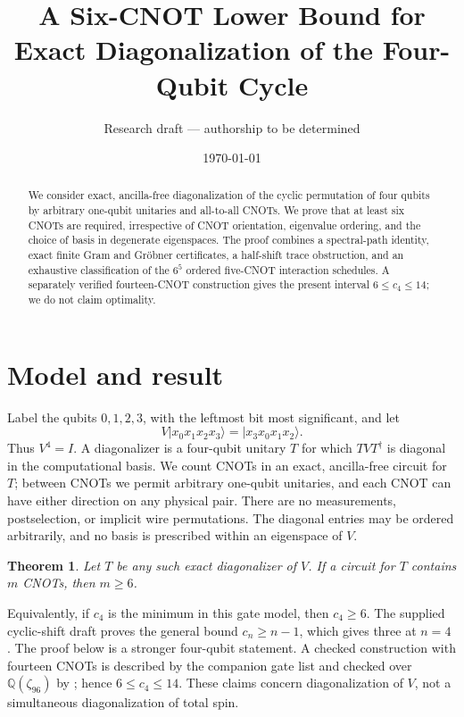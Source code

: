 \documentclass[11pt]{article}
\title{A Six-CNOT Lower Bound for Exact Diagonalization of the Four-Qubit Cycle}
\author{Research draft --- authorship to be determined}
\date{\today}
\newtheorem{theorem}{Theorem}
\begin{document}
\maketitle

\begin{abstract}
We consider exact, ancilla-free diagonalization of the cyclic permutation of
four qubits by arbitrary one-qubit unitaries and all-to-all CNOTs.  We prove
that at least six CNOTs are required, irrespective of CNOT orientation,
eigenvalue ordering, and the choice of basis in degenerate eigenspaces.  The
proof combines a spectral-path identity, exact finite Gram and Gr\"obner
certificates, a half-shift trace obstruction, and an exhaustive classification
of the $6^5$ ordered five-CNOT interaction schedules.  A separately verified
fourteen-CNOT construction gives the present interval $6\leq c_4\leq14$;
we do not claim optimality.
\end{abstract}

\section{Model and result}

Label the qubits $0,1,2,3$, with the leftmost bit most significant, and let
\begin{equation}\label{eq:shift}
V\lvert x_0x_1x_2x_3\rangle
 =\lvert x_3x_0x_1x_2\rangle .
\end{equation}
Thus $V^4=I$.  A diagonalizer is a four-qubit unitary $T$ for which
$TVT^\dagger$ is diagonal in the computational basis.  We count CNOTs in an
exact, ancilla-free circuit for $T$; between CNOTs we permit arbitrary
one-qubit unitaries, and each CNOT can have either direction on any physical
pair.  There are no measurements, postselection, or implicit wire
permutations.  The diagonal entries may be ordered arbitrarily, and no basis
is prescribed within an eigenspace of $V$.

\begin{theorem}\label{thm:main}
Let $T$ be any such exact diagonalizer of $V$.  If a circuit for $T$ contains
$m$ CNOTs, then $m\geq6$.
\end{theorem}

Equivalently, if $c_4$ is the minimum in this gate model, then
$c_4\geq6$.  The supplied cyclic-shift draft proves the general bound
$c_n\geq n-1$, which gives three at $n=4$ \cite[Theorem~2]{cycle-draft}.
The proof below is a stronger four-qubit statement.  A checked construction
with fourteen CNOTs is described by the companion gate list
 and checked over
$\mathbb Q(\zeta_{96})$ by ; hence
$6\leq c_4\leq14$.  These claims concern diagonalization of $V$, not a
simultaneous diagonalization of total spin.
\end{document}
